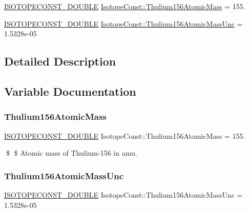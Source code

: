 \begin{DoxyCompactItemize}
\item 
\mbox{\hyperlink{group___isotope_const-_macros_ga8f45a7272ce02c0b4c65c44636ed719a}{I\+S\+O\+T\+O\+P\+E\+C\+O\+N\+S\+T\+\_\+\+D\+O\+U\+B\+LE}} \mbox{\hyperlink{group___isotope_const-_thulium-_tm156_ga62e74f27d3ebe230ceb9e13c20dd2a58}{Isotope\+Const\+::\+Thulium156\+Atomic\+Mass}} = 155.
\item 
\mbox{\hyperlink{group___isotope_const-_macros_ga8f45a7272ce02c0b4c65c44636ed719a}{I\+S\+O\+T\+O\+P\+E\+C\+O\+N\+S\+T\+\_\+\+D\+O\+U\+B\+LE}} \mbox{\hyperlink{group___isotope_const-_thulium-_tm156_ga9ab4408fb53925f108bd172674b91eb9}{Isotope\+Const\+::\+Thulium156\+Atomic\+Mass\+Unc}} = 1.\+5328e-\/05
\end{DoxyCompactItemize}


\subsection{Detailed Description}


\subsection{Variable Documentation}
\mbox{\label{group___isotope_const-_thulium-_tm156_ga62e74f27d3ebe230ceb9e13c20dd2a58}} 
\subsubsection{\texorpdfstring{Thulium156\+Atomic\+Mass}{Thulium156AtomicMass}}
{\footnotesize\ttfamily \mbox{\hyperlink{group___isotope_const-_macros_ga8f45a7272ce02c0b4c65c44636ed719a}{I\+S\+O\+T\+O\+P\+E\+C\+O\+N\+S\+T\+\_\+\+D\+O\+U\+B\+LE}} Isotope\+Const\+::\+Thulium156\+Atomic\+Mass = 155.}

\$ \$ Atomic mass of Thulium-\/156 in amu. \mbox{\label{group___isotope_const-_thulium-_tm156_ga9ab4408fb53925f108bd172674b91eb9}} 
\subsubsection{\texorpdfstring{Thulium156\+Atomic\+Mass\+Unc}{Thulium156AtomicMassUnc}}
{\footnotesize\ttfamily \mbox{\hyperlink{group___isotope_const-_macros_ga8f45a7272ce02c0b4c65c44636ed719a}{I\+S\+O\+T\+O\+P\+E\+C\+O\+N\+S\+T\+\_\+\+D\+O\+U\+B\+LE}} Isotope\+Const\+::\+Thulium156\+Atomic\+Mass\+Unc = 1.\+5328e-\/05}

